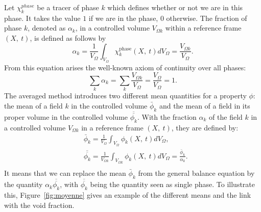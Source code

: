 Let $\chi^{phase}_k$ be a tracer of phase $k$ which defines whether or not we are in this phase. It takes the value $1$ if we are in the phase, $0$ otherwise. The fraction of phase $k$, denoted as $\alpha_k$, in a controlled volume $V_{\Omega k}$ within a reference frame $(X,\ t)$, is defined as follows by
\begin{equation}
    \alpha_k=\frac{1}{V_\Omega}\int_{V_\Omega} \chi^{\text{phase}}_k(X,\ t) dV_\Omega=\frac{V_{\Omega k}}{V_\Omega}.
\end{equation}
From this equation arises the well-known axiom of continuity over all phases:
\begin{equation}\label{base:contaxiom}
    \sum_k\alpha_k=\sum_k\frac{V_{\Omega k}}{V_\Omega}=\frac{V_{\Omega}}{V_\Omega}=1.
\end{equation}
The averaged method introduces two different mean quantities for a property $\phi$: the mean of a field $k$ in the controlled volume $\bar{\phi}_k$ and the mean of a field in its proper volume in the controlled volume $\overline{\overline{{\phi}_k}}$. With the fraction $\alpha_k$ of the field $k$ in a controlled volume $V_{\Omega k}$ in a reference frame $(X,\ t)$, they are defined by:
\begin{align}
    &\bar{\phi}_k=\frac{1}{V_\Omega}\int_{V_{\Omega}}\phi_k(X,\ t)dV_\Omega,\\
    &\overline{\overline{{\phi}_k}}=\frac{1}{V_{\Omega k}}\int_{V_{\Omega k}} \phi_k(X,\ t) dV_\Omega=\frac{\bar{\phi}_k}{\alpha_k}.\\
\end{align}
It means that we can replace the mean $\bar{\phi}_k$ from the general balance equation by the quantity $\alpha_k \overline{\overline{{\phi}_k}}$, with $\overline{\overline{{\phi}_k}}$ being the quantity seen as single phase. To illustrate this, Figure~\ref{fig:moyenne} gives an example of the different means and the link with the void fraction. 
